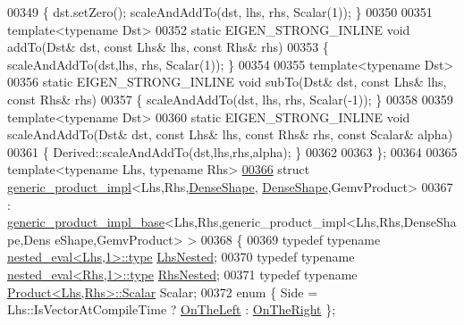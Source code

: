 \begin{DoxyCode}
00349   \{ dst.setZero(); scaleAndAddTo(dst, lhs, rhs, Scalar(1)); \}
00350 
00351   \textcolor{keyword}{template}<\textcolor{keyword}{typename} Dst>
00352   \textcolor{keyword}{static} EIGEN\_STRONG\_INLINE \textcolor{keywordtype}{void} addTo(Dst& dst, \textcolor{keyword}{const} Lhs& lhs, \textcolor{keyword}{const} Rhs& rhs)
00353   \{ scaleAndAddTo(dst,lhs, rhs, Scalar(1)); \}
00354 
00355   \textcolor{keyword}{template}<\textcolor{keyword}{typename} Dst>
00356   \textcolor{keyword}{static} EIGEN\_STRONG\_INLINE \textcolor{keywordtype}{void} subTo(Dst& dst, \textcolor{keyword}{const} Lhs& lhs, \textcolor{keyword}{const} Rhs& rhs)
00357   \{ scaleAndAddTo(dst, lhs, rhs, Scalar(-1)); \}
00358   
00359   \textcolor{keyword}{template}<\textcolor{keyword}{typename} Dst>
00360   \textcolor{keyword}{static} EIGEN\_STRONG\_INLINE \textcolor{keywordtype}{void} scaleAndAddTo(Dst& dst, \textcolor{keyword}{const} Lhs& lhs, \textcolor{keyword}{const} Rhs& rhs, \textcolor{keyword}{const} Scalar& 
      alpha)
00361   \{ Derived::scaleAndAddTo(dst,lhs,rhs,alpha); \}
00362 
00363 \};
00364 
00365 \textcolor{keyword}{template}<\textcolor{keyword}{typename} Lhs, \textcolor{keyword}{typename} Rhs>
\hyperlink{struct_eigen_1_1internal_1_1generic__product__impl_3_01_lhs_00_01_rhs_00_01_dense_shape_00_01_de08ea17a2bb9af046a7c3ddff957c62b0}{00366} \textcolor{keyword}{struct }\hyperlink{struct_eigen_1_1internal_1_1generic__product__impl}{generic\_product\_impl}<Lhs,Rhs,\hyperlink{struct_eigen_1_1_dense_shape}{DenseShape},
      \hyperlink{struct_eigen_1_1_dense_shape}{DenseShape},GemvProduct>
00367   : \hyperlink{struct_eigen_1_1internal_1_1generic__product__impl__base}{generic\_product\_impl\_base}<Lhs,Rhs,generic\_product\_impl<Lhs,Rhs,DenseShape,Dens
      eShape,GemvProduct> >
00368 \{
00369   \textcolor{keyword}{typedef} \textcolor{keyword}{typename} \hyperlink{class_eigen_1_1internal_1_1_tensor_lazy_evaluator_writable}{nested\_eval<Lhs,1>::type} \hyperlink{class_eigen_1_1internal_1_1_tensor_lazy_evaluator_writable}{LhsNested};
00370   \textcolor{keyword}{typedef} \textcolor{keyword}{typename} \hyperlink{class_eigen_1_1internal_1_1_tensor_lazy_evaluator_writable}{nested\_eval<Rhs,1>::type} \hyperlink{class_eigen_1_1internal_1_1_tensor_lazy_evaluator_writable}{RhsNested};
00371   \textcolor{keyword}{typedef} \textcolor{keyword}{typename} \hyperlink{group___core___module_class_eigen_1_1_product}{Product<Lhs,Rhs>::Scalar} Scalar;
00372   \textcolor{keyword}{enum} \{ Side = Lhs::IsVectorAtCompileTime ? \hyperlink{group__enums_ggac22de43beeac7a78b384f99bed5cee0ba129609b3bdf23b071f5f86cf2f995ec4}{OnTheLeft} : \hyperlink{group__enums_ggac22de43beeac7a78b384f99bed5cee0ba99dc75d8e00b6c3a5bdc31940f47492b}{OnTheRight} \};

\end{DoxyCode}
